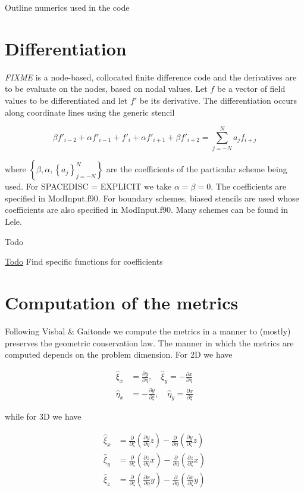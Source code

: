 Outline numerics used in the code\hypertarget{numerics_difference}{}\section{Differentiation}\label{numerics_difference}
{\itshape F\+I\+X\+ME} is a node-\/based, collocated finite difference code and the derivatives are to be evaluate on the nodes, based on nodal values. Let $f$ be a vector of field values to be differentiated and let $f'$ be its derivative. The differentiation occurs along coordinate lines using the generic stencil

\[ \beta f'_{i-2} + \alpha f'_{i-1} + f'_i + \alpha f'_{i+1} + \beta f'_{i+2} = \sum_{j=-N}^N a_j f_{i+j} \]

where $\left\{\beta, \alpha, \left\{a_j\right\}_{j=-N}^N\right\}$ are the coefficients of the particular scheme being used. For {\ttfamily S\+P\+A\+C\+E\+D\+I\+SC = E\+X\+P\+L\+I\+C\+IT} we take $\alpha = \beta = 0$. The coefficients are specified in Mod\+Input.\+f90. For boundary schemes, biased stencils are used whose coefficients are also specified in Mod\+Input.\+f90. Many schemes can be found in Lele\cite{lele:1992}.

\begin{DoxyRefDesc}{Todo}
\item[\hyperlink{todo__todo000002}{Todo}]Find specific functions for coefficients\end{DoxyRefDesc}
\hypertarget{numerics_meterics}{}\section{Computation of the metrics}\label{numerics_meterics}
Following Visbal \& Gaitonde\cite{visbal/gaitonde:2002} we compute the metrics in a manner to (mostly) preserves the geometric conservation law. The manner in which the metrics are computed depends on the problem dimension. For 2D we have

\[ \begin{aligned} \hat{\xi}_x &= \frac{\partial y}{\partial \eta}, \quad \hat{\xi}_y = -\frac{\partial x}{\partial \eta} \\ \hat{\eta}_x &= -\frac{\partial y}{\partial \xi}, \quad \hat{\eta}_y = \frac{\partial x}{\partial \xi} \end{aligned} \]

while for 3D we have

\[ \begin{aligned} \hat{\xi}_x &= \frac{\partial}{\partial \zeta}\left(\frac{\partial y}{\partial \eta}z\right) - \frac{\partial}{\partial \eta}\left(\frac{\partial y}{\partial \zeta}z\right) \\ \hat{\xi}_y &= \frac{\partial}{\partial \zeta}\left(\frac{\partial z}{\partial \eta}x\right) - \frac{\partial}{\partial \eta}\left(\frac{\partial z}{\partial \zeta}x\right) \\ \hat{\xi}_z &= \frac{\partial}{\partial \zeta}\left(\frac{\partial x}{\partial \eta}y\right) - \frac{\partial}{\partial \eta}\left(\frac{\partial x}{\partial \zeta}y\right) \end{aligned} \]


